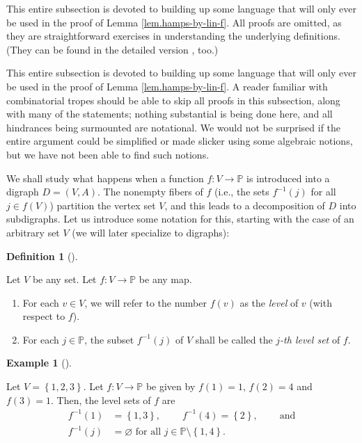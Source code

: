 \documentclass[numbers=enddot,12pt,final,onecolumn,notitlepage]{scrartcl}%
\newcounter{exer}
\numberwithin{exer}{section}
\theoremstyle{definition}
\newtheorem{defi}[theo]{Definition}
\newenvironment{definition}[1][]
{\begin{defi}[#1]\begin{leftbar}}
{\end{leftbar}\end{defi}}
\newtheorem{exam}[theo]{Example}
\newenvironment{example}[1][]
{\begin{exam}[#1]\begin{leftbar}}
{\end{leftbar}\end{exam}}
\newenvironment{verlong}{}{}
\newenvironment{vershort}{}{}
\begin{document}
\begin{vershort}
This entire subsection is devoted to building up some language that will only
ever be used in the proof of Lemma \ref{lem.hamps-by-lin-f}. All proofs are
omitted, as they are straightforward exercises in understanding the underlying
definitions. (They can be found in the detailed version \cite{verlong}, too.)
\end{vershort}

\begin{verlong}
This entire subsection is devoted to building up some language that will only
ever be used in the proof of Lemma \ref{lem.hamps-by-lin-f}. A reader familiar
with combinatorial tropes should be able to skip all proofs in this
subsection, along with many of the statements; nothing substantial is being
done here, and all hindrances being surmounted are notational. We would not be
surprised if the entire argument could be simplified or made slicker using
some algebraic notions, but we have not been able to find such notions.
\end{verlong}

We shall study what happens when a function $f:V\rightarrow\mathbb{P}$ is
introduced into a digraph $D=\left(  V,A\right)  $. The nonempty fibers of $f$
(i.e., the sets $f^{-1}\left(  j\right)  $ for all $j\in f\left(  V\right)  $)
partition the vertex set $V$, and this leads to a decomposition of $D$ into
subdigraphs. Let us introduce some notation for this, starting with the case
of an arbitrary set $V$ (we will later specialize to digraphs):

\begin{definition}
\label{def.level.levsets}Let $V$ be any set. Let $f:V\rightarrow\mathbb{P}$ be
any map.

\begin{enumerate}
\item[\textbf{(a)}] For each $v\in V$, we will refer to the number $f\left(
v\right)  $ as the \emph{level} of $v$ (with respect to $f$).

\item[\textbf{(b)}] For each $j\in\mathbb{P}$, the subset $f^{-1}\left(
j\right)  $ of $V$ shall be called the $j$\emph{-th level set} of $f$.
\end{enumerate}
\end{definition}

\begin{example}
Let $V=\left\{  1,2,3\right\}  $. Let $f:V\rightarrow\mathbb{P}$ be given by
$f\left(  1\right)  =1$, $f\left(  2\right)  =4$ and $f\left(  3\right)  =1$.
Then, the level sets of $f$ are
\begin{align*}
f^{-1}\left(  1\right)   &  =\left\{  1,3\right\}  ,\ \ \ \ \ \ \ \ \ \ f^{-1}%
\left(  4\right)  =\left\{  2\right\}  ,\ \ \ \ \ \ \ \ \ \ \text{and}\\
f^{-1}\left(  j\right)   &  =\varnothing\text{ for all }j\in\mathbb{P}%
\setminus\left\{  1,4\right\}  .
\end{align*}

\end{example}
\end{document}
